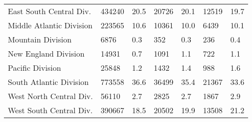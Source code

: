 \begin{longtable}{lllllll}
East South Central Div. & 434240 & 20.5 & 20726 & 20.1 & 12519 & 19.7 \\ 
Middle Atlantic Division & 223565 & 10.6 & 10361 & 10.0 & 6439 & 10.1 \\ 
Mountain Division & 6876 & 0.3 & 352 & 0.3 & 236 & 0.4 \\ 
New England Division & 14931 & 0.7 & 1091 & 1.1 & 722 & 1.1 \\ 
Pacific Division & 25848 & 1.2 & 1432 & 1.4 & 988 & 1.6 \\ 
South Atlantic Division & 773558 & 36.6 & 36499 & 35.4 & 21367 & 33.6 \\ 
West North Central Div. & 56110 & 2.7 & 2825 & 2.7 & 1867 & 2.9 \\ 
West South Central Div. & 390667 & 18.5 & 20502 & 19.9 & 13508 & 21.2 \\ 
\bottomrule
\end{longtable}

